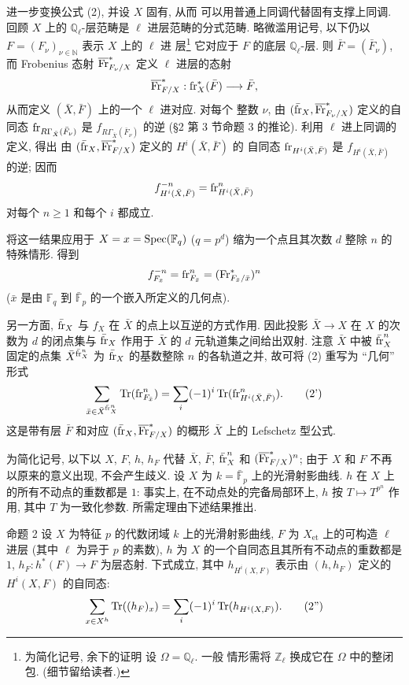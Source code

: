 进一步变换公式 (2), 并设 $X$ 固有, 从而
可以用普通上同调代替固有支撑上同调.
回顾 $X$ 上的 $\mathbb Q_\ell$-层范畴是
$\ell$ 进层范畴的分式范畴.
略微滥用记号, 以下仍以
$F=(F_\nu)_{\nu\in\mathbb N}$ 表示 $X$ 上的 $\ell$ 进
层\footnote{为简化记号, 余下的证明
设 $\Omega=\mathbb Q_\ell$. 一般
情形需将 $\mathbb Z_\ell$ 换成它在 $\Omega$ 中的整闭包.
(细节留给读者.)}
它对应于 $F$ 的底层 $\mathbb Q_\ell$-层.
则 $\bar F=(\bar F_\nu)$, 而 Frobenius 态射
$\overline{\operatorname{Fr}}^*_{F_\nu/X}$ 定义 $\ell$ 进层的态射
\[
\overline{\operatorname{Fr}}^*_{F/X}:
\operatorname{fr}_X^*(\bar F)\longrightarrow\bar F,
\]
从而定义 $(\bar X,\bar F)$ 上的一个 $\ell$ 进对应. 对每个
整数 $\nu$, 由
$(\bar{\operatorname{fr}}_X,\overline{\operatorname{Fr}}^*_{F_\nu/X})$ 定义的自同态
$\operatorname{fr}_{R\Gamma_{\bar X}(\bar F_\nu)}$ 是
$f_{R\Gamma_{\bar X}(\bar F_\nu)}$ 的逆 (§2 第 3 节命题 3 的推论).
利用 $\ell$ 进上同调的定义, 得出
由 $(\bar{\operatorname{fr}}_X,\overline{\operatorname{Fr}}^*_{F/X})$ 定义的 $H^i(\bar X,\bar F)$ 的
自同态 $\operatorname{fr}_{H^i(\bar X,\bar F)}$ 是
$f_{H^i(\bar X,\bar F)}$ 的逆; 因而
\[
f^{-n}_{H^i(\bar X,\bar F)}
=\operatorname{fr}^n_{H^i(\bar X,\bar F)}
\]
对每个 $n\ge1$ 和每个 $i$ 都成立.

将这一结果应用于 $X=x=\operatorname{Spec}(\mathbb F_q)$ ($q=p^d$) 缩为一个点且其次数 $d$ 整除 $n$ 的特殊情形. 得到
\[
f^{-n}_{F_{\bar x}}=\operatorname{fr}^n_{F_{\bar x}}=(\operatorname{Fr}^*_{F_{\bar x}/\bar x})^n
\]
($\bar x$ 是由 $\mathbb F_q$ 到 $\bar{\mathbb F}_p$ 的一个嵌入所定义的几何点).

另一方面, $\bar{\operatorname{fr}}_X$ 与 $f_X$ 在 $\bar X$ 的点上以互逆的方式作用. 因此投影 $\bar X\to X$ 在 $X$ 的次数为 $d$ 的闭点集与 $\bar{\operatorname{fr}}_X$ 作用于 $\bar X$ 的 $d$ 元轨道集之间给出双射. 注意 $\bar X$ 中被 $\bar{\operatorname{fr}}_X^n$ 固定的点集 $\bar X^{\bar{\operatorname{fr}}_X^n}$ 为 $\bar{\operatorname{fr}}_X$ 的基数整除 $n$ 的各轨道之并, 故可将 (2) 重写为 ``几何'' 形式
\[
\sum_{\bar x\in\bar X^{\bar{\operatorname{fr}}_X^n}}\operatorname{Tr}(\operatorname{fr}^n_{F_{\bar x}})
=\sum_i(-1)^i\operatorname{Tr}(\operatorname{fr}^n_{H^i(\bar X,\bar F)}).
\tag{2'}
\]
这是带有层 $\bar F$ 和对应 $(\bar{\operatorname{fr}}_X,\overline{\operatorname{Fr}}^*_{F/X})$ 的概形 $\bar X$ 上的 Lefschetz 型公式.

为简化记号, 以下以 $X$, $F$, $h$, $h_F$ 代替 $\bar X$, $\bar F$, $\bar{\operatorname{fr}}_X^n$ 和 $(\overline{\operatorname{Fr}}^*_{F/X})^n$; 由于 $X$ 和 $F$ 不再以原来的意义出现, 不会产生歧义. 设 $X$ 为 $k=\bar{\mathbb F}_p$ 上的光滑射影曲线. $h$ 在 $X$ 上的所有不动点的重数都是 $1$: 事实上, 在不动点处的完备局部环上, $h$ 按 $T\mapsto T^{p^n}$ 作用, 其中 $T$ 为一致化参数. 所需定理由下述结果推出.

\begin{statement}{命题 2}
设 $X$ 为特征 $p$ 的代数闭域 $k$ 上的光滑射影曲线, $F$ 为 $X_{\mathrm{et}}$ 上的可构造 $\ell$ 进层 (其中 $\ell$ 为异于 $p$ 的素数), $h$ 为 $X$ 的一个自同态且其所有不动点的重数都是 $1$, $h_F:h^*(F)\to F$ 为层态射. 下式成立, 其中 $h_{H^i(X,F)}$ 表示由 $(h,h_F)$ 定义的 $H^i(X,F)$ 的自同态:
\[
\sum_{x\in X^h}\operatorname{Tr}((h_F)_x)=\sum_i(-1)^i\operatorname{Tr}(h_{H^i(X,F)}).
\tag{2''}
\]
\end{statement}

